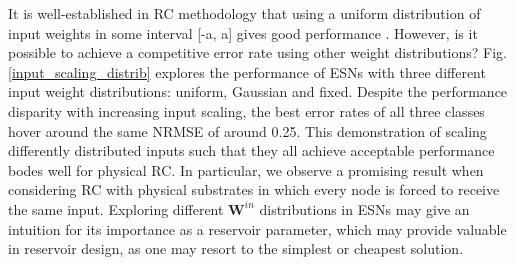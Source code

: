 It is well-established in RC methodology that using a uniform distribution of
input weights in some interval [-a, a] gives good performance
\cite{montavon_practical_2012}. However, is it possible to achieve a competitive
error rate using other weight distributions?  Fig. \ref{input_scaling_distrib}
explores the performance of ESNs with three different input weight
distributions: uniform, Gaussian and fixed. Despite the performance disparity
with increasing input scaling, the best error rates of all three classes hover
around the same NRMSE of around 0.25. This demonstration of scaling differently
distributed inputs such that they all achieve acceptable performance bodes well
for physical RC. In particular, we observe a promising result when considering
RC with physical substrates in which every node is forced to receive the same
input. Exploring different $\mathbf{W}^{in}$ distributions in ESNs may give an
intuition for its importance as a reservoir parameter, which may provide
valuable in reservoir design, as one may resort to the simplest or cheapest
solution.

